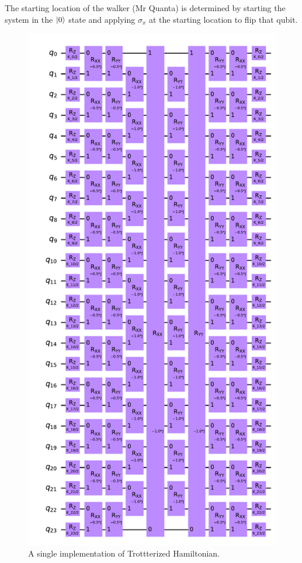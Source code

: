\documentclass[11pt]{article}
\begin{document}
    The starting location of the walker  (Mr Quanta) is determined by starting the system in the $\left| 0 \right>$ state and applying $\sigma_x$ at the starting location to flip that qubit. 
    \begin{figure}[H]
      \centering
      \includegraphics[scale =  0.2]{Figures/Unitary_Gate_iQuHACK23.pdf}
      \caption{A single implementation of Trottterized Hamiltonian.}\label{fig:Circuit}
    \end{figure}
    
\end{document}
